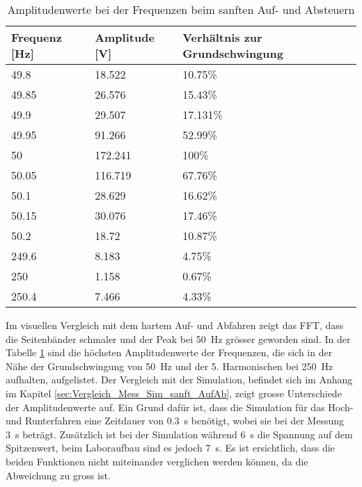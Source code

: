\begin{table}[ht!]
	\centering
	\begin{tabular}{|l|l|l|}
		\hline
		Frequenz {[}Hz{]} & Amplitude {[}V{]} & Verhältnis zur Grundschwingung \\ \hline
		49.8              & 18.522            & 10.75\%                        \\ \hline
		49.85             & 26.576            & 15.43\%                        \\ \hline
		49.9              & 29.507            & 17.131\%                       \\ \hline
		49.95             & 91.266            & 52.99\%                        \\ \hline
		50                & 172.241           & 100\%                          \\ \hline
		50.05             & 116.719           & 67.76\%                        \\ \hline
		50.1              & 28.629            & 16.62\%                        \\ \hline
		50.15             & 30.076            & 17.46\%                        \\ \hline
		50.2              & 18.72             & 10.87\%                        \\ \hline
		249.6             & 8.183             & 4.75\%                         \\ \hline
		250               & 1.158             & 0.67\%                         \\ \hline
		250.4             & 7.466             & 4.33\%                         \\ \hline
	\end{tabular}
\caption{Amplitudenwerte bei der Frequenzen beim sanften Auf- und Absteuern}\label{tab:Mess_Spannung_AufAb_sanft}
\end{table}

Im visuellen Vergleich mit dem hartem Auf- und Abfahren zeigt das FFT, dass die Seitenbänder schmaler und der Peak bei \SI{50}{Hz} grösser geworden sind. In der Tabelle \ref{tab:Mess_Spannung_AufAb_sanft} sind die höchsten Amplitudenwerte der Frequenzen, die sich in der Nähe der Grundschwingung von \SI{50}{Hz} und der 5. Harmonischen bei \SI{250}{Hz} aufhalten, aufgelistet. Der Vergleich mit der Simulation, befindet sich im Anhang im Kapitel \ref{sec:Vergleich_Mess_Sim_sanft_AufAb}, zeigt grosse Unterschiede der Amplitudenwerte auf. Ein Grund dafür ist, dass die Simulation für das Hoch- und Runterfahren eine Zeitdauer von \SI{0.3}{s} benötigt, wobei sie bei der Messung \SI{3}{s} beträgt. Zusätzlich ist bei der Simulation während \SI{6}{s} die Spannung auf dem Spitzenwert, beim Laboraufbau sind es jedoch \SI{7}{s}. Es ist ersichtlich, dass die beiden Funktionen nicht miteinander verglichen werden können, da die Abweichung zu gross ist.


